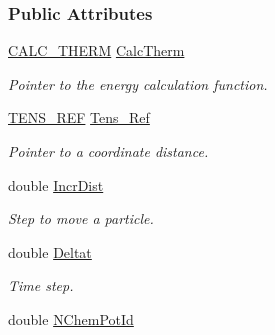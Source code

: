 \subsubsection*{\-Public \-Attributes}
\begin{DoxyCompactItemize}
\item 
\hypertarget{classForces_ad70e5d3740ce86208f93f64c134cd67a}{\hyperlink{classForces_a7cc9ca7ba348e21f2e8597fc07969a51}{\-C\-A\-L\-C\-\_\-\-T\-H\-E\-R\-M} \hyperlink{classForces_ad70e5d3740ce86208f93f64c134cd67a}{\-Calc\-Therm}}\label{classForces_ad70e5d3740ce86208f93f64c134cd67a}

\begin{DoxyCompactList}\small\item\em \-Pointer to the energy calculation function. \end{DoxyCompactList}\item 
\hypertarget{classForces_ac399a421f2e2ac8c1af8b456ce4d6e5c}{\hyperlink{classForces_ae3f1140396007efe5fb7ca46884892eb}{\-T\-E\-N\-S\-\_\-\-R\-E\-F} \hyperlink{classForces_ac399a421f2e2ac8c1af8b456ce4d6e5c}{\-Tens\-\_\-\-Ref}}\label{classForces_ac399a421f2e2ac8c1af8b456ce4d6e5c}

\begin{DoxyCompactList}\small\item\em \-Pointer to a coordinate distance. \end{DoxyCompactList}\item 
\hypertarget{classForces_a3849139567c198e89d67104e61a42b79}{double \hyperlink{classForces_a3849139567c198e89d67104e61a42b79}{\-Incr\-Dist}}\label{classForces_a3849139567c198e89d67104e61a42b79}

\begin{DoxyCompactList}\small\item\em \-Step to move a particle. \end{DoxyCompactList}\item 
\hypertarget{classForces_ac321dc561843cb5d3f74604036a3a8da}{double \hyperlink{classForces_ac321dc561843cb5d3f74604036a3a8da}{\-Deltat}}\label{classForces_ac321dc561843cb5d3f74604036a3a8da}

\begin{DoxyCompactList}\small\item\em \-Time step. \end{DoxyCompactList}\item 
\hypertarget{classForces_a1e6e0ae467497e3c8ed1e1cc017e74b9}{double \hyperlink{classForces_a1e6e0ae467497e3c8ed1e1cc017e74b9}{\-N\-Chem\-Pot\-Id}}\label{classForces_a1e6e0ae467497e3c8ed1e1cc017e74b9}


\end{DoxyCompactItemize}
